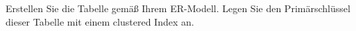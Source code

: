 \item Erstellen Sie die Tabelle  gemäß Ihrem ER-Modell.
Legen Sie den Primärschlüssel dieser Tabelle mit einem clustered Index an.
